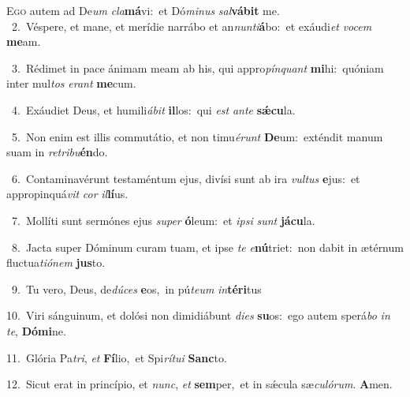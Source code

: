 \lettrine{\initial\textcolor{\initialcolor}{E}}{go} autem ad De\textit{um} \textit{cla}\-\textbf{má}vi:~\star et Dó\-\textit{mi}\-\textit{nus} \textit{sal}\-\textbf{vá}\textbf{bit} me.\\
{\numbfont\textcolor{\numbcolor}{~2.}}~Véspere, et mane, et merídie narrábo et an\-\textit{nun}\-\textit{ti}\textbf{á}bo:~\star et exáudi\textit{et} \textit{vo}\-\textit{cem} \textbf{me}\-am.\par
{\numbfont\textcolor{\numbcolor}{~3.}}~Rédimet in pace ánimam meam ab his, qui appro\-\textit{pín}\-\textit{quant} \textbf{mi}\-hi:~\star quóniam inter mul\textit{tos} \textit{e}\-\textit{rant} \textbf{me}\-cum.\par
{\numbfont\textcolor{\numbcolor}{~4.}}~Exáudiet Deus, et humili\-\textit{á}\-\textit{bit} \textbf{il}\-los:~\star qui \textit{est} \textit{an}\-\textit{te} \textbf{sǽ}\-\textbf{cu}la.\par
{\numbfont\textcolor{\numbcolor}{~5.}}~Non enim est illis commutátio, et non timu\-\textit{é}\-\textit{runt} \textbf{De}\-um:~\star exténdit manum suam in \textit{re}\-\textit{tri}\textit{bu}\textbf{én}do.\par
{\numbfont\textcolor{\numbcolor}{~6.}}~Contaminavérunt testaméntum ejus, divísi sunt ab ira \textit{vul}\-\textit{tus} \textbf{e}\-jus:~\star et appropinquá\textit{vit} \textit{cor} \textit{il}\-\textbf{lí}us.\par
{\numbfont\textcolor{\numbcolor}{~7.}}~Mollíti sunt sermónes ejus \textit{su}\-\textit{per} \textbf{ó}\-leum:~\star et \textit{ip}\-\textit{si} \textit{sunt} \textbf{já}\-\textbf{cu}la.\par
{\numbfont\textcolor{\numbcolor}{~8.}}~Jacta super Dóminum curam tuam, et ipse \textit{te} \textit{e}\-\textbf{nú}triet:~\star non dabit in ætérnum fluctua\-\textit{ti}\-\textit{ó}\textit{nem} \textbf{jus}\-to.\par
{\numbfont\textcolor{\numbcolor}{~9.}}~Tu vero, Deus, de\-\textit{dú}\-\textit{ces} \textbf{e}\-os,~\star in pú\-\textit{te}\-\textit{um} \textit{in}\-\textbf{tér}\textbf{i}tus\par
{\numbfont\textcolor{\numbcolor}{10.}}~Viri sánguinum, et dolósi non dimidiábunt \textit{di}\-\textit{es} \textbf{su}\-os:~\star ego autem sperá\textit{bo} \textit{in} \textit{te}\-, \textbf{Dó}\-\textbf{mi}ne.\par
{\numbfont\textcolor{\numbcolor}{11.}}~Glória Pa\-\textit{tri}\-, \textit{et} \textbf{Fí}\-lio,~\star et Spi\-\textit{rí}\-\textit{tu}\textit{i} \textbf{Sanc}\-to.\par
{\numbfont\textcolor{\numbcolor}{12.}}~Sicut erat in princípio, et \textit{nunc}\-, \textit{et} \textbf{sem}\-per,~\star et in sǽcula sæ\-\textit{cu}\-\textit{ló}\textit{rum}. \textbf{A}\-men.\par
